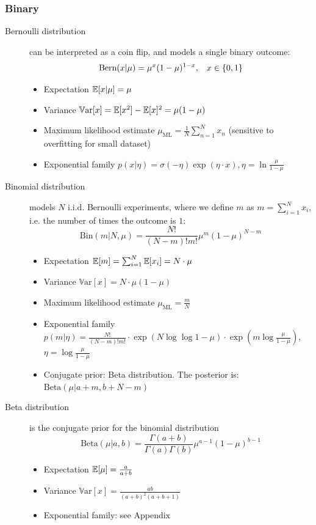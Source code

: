 \subsubsection{Binary}
\begin{description}
	\item[Bernoulli distribution] can be interpreted as a coin flip, and models a single binary outcome:
	$$\text{Bern}(x|\mu)=\mu^{x}(1-\mu)^{1-x}, \hspace{3mm}x\in\{0,1\}$$
	\begin{itemize}
		\item Expectation $\mathbb{E}[x|\mu]=\mu$
		\item Variance $\mathbb{V}\text{ar}[x]=\mathbb{E}[x^2]-\mathbb{E}[x]^2=\mu(1-\mu)$
		\item Maximum likelihood estimate $\mu_{\text{ML}}=\frac{1}{N}\sum_{n=1}^{N} x_n$ (sensitive to overfitting for small dataset)
		\item Exponential family $p(x|\eta)=\sigma(-\eta)\exp(\eta\cdot x), \eta=\ln \frac{\mu}{1-\mu}$
	\end{itemize}

	\item[Binomial distribution] models $N$ i.i.d. Bernoulli experiments, where we define $m$ as $m=\sum_{i=1}^{N}x_i$, i.e. the number of times the outcome is $1$:
	$$\text{Bin}(m|N,\mu)=\frac{N!}{(N-m)!m!}\mu^{m}(1 - \mu)^{N-m}$$	
	\begin{itemize}
		\item Expectation $\mathbb{E}[m]=\sum_{i=1}^{N}\mathbb{E}[x_i]=N\cdot \mu$
		\item Variance $\mathbb{V}\text{ar}[x]=N\cdot \mu(1-\mu)$
		\item Maximum likelihood estimate $\mu_{\text{ML}}=\frac{m}{N}$
		\item Exponential family $p(m|\eta)=\frac{N!}{(N-m)!m!}\cdot \exp(N\log \log 1-\mu) \cdot \exp(m\log\frac{\mu}{1-\mu})$, $\eta=\log \frac{\mu}{1-\mu}$
		\item Conjugate prior: Beta distribution. The posterior is: $\text{Beta}(\mu|a+m,b+N-m)$
	\end{itemize}

	\item[Beta distribution] is the conjugate prior for the binomial distribution
	$$\text{Beta}(\mu|a,b)=\frac{\Gamma(a+b)}{\Gamma(a)\Gamma(b)}\mu^{a-1}(1-\mu)^{b-1}$$
	\begin{itemize}
		\item Expectation $\mathbb{E}[\mu]=\frac{a}{a+b}$
		\item Variance $\mathbb{V}\text{ar}[x]=\frac{ab}{(a+b)^2(a+b+1)}$
		\item Exponential family: see Appendix
	\end{itemize}
\end{description}
